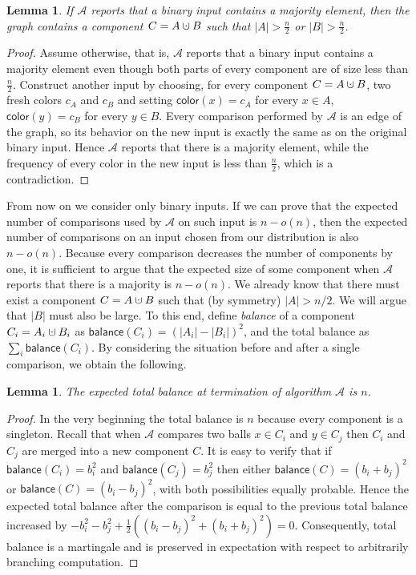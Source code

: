 \documentclass{article}[11pt,a4paper]
\newtheorem{lemma}[definition]{Lemma}
\newcommand{\ballcolor}{\mathsf{color}}
\newcommand{\balance}{\mathsf{balance}}
\newcommand{\cupdot}{\mathbin{\mathaccent\cdot\cup}}
\begin{document}
\begin{lemma}
\label{lem:terminate}
If $\mathcal{A}$ reports that a binary input contains a majority element, then the graph contains a
component $C = A \cupdot B$ such that $|A| > \frac{n}{2}$ or $|B| > \frac{n}{2}$.
\end{lemma}

\begin{proof}
Assume otherwise, that is, $\mathcal{A}$ reports that a binary input contains a majority element
even though both parts of every component are of size less than $\frac{n}{2}$. Construct another
input by choosing, for every component $C = A \cupdot B$, two fresh colors $c_A$ and $c_B$ and
setting $\ballcolor(x) = c_A$ for every $x\in A$, $\ballcolor(y) = c_B$ for every $y \in B$.
Every comparison performed by $\mathcal{A}$ is an edge of the graph, so its behavior on the new input
is exactly the same as on the original binary input. Hence $\mathcal{A}$ reports that there is
a majority element, while the frequency of every color in the new input is less than $\frac{n}{2}$,
which is a contradiction.
\end{proof}

From now on we consider only binary inputs. If we can prove that the expected number of comparisons
used by $\mathcal{A}$ on such input is $n-o(n)$, then the expected number of comparisons 
on an input chosen from our distribution is also $n-o(n)$.
Because every comparison decreases the number of components by one, it is sufficient to argue
that the expected size of some component when $\mathcal{A}$ reports that there is a majority
is $n-o(n)$. We already know that there must exist a component $C = A \cupdot B$ such that
(by symmetry) $|A| > n/2$. We will argue that $|B|$ must also be large.
To this end, define \emph{balance} of a component $C_i = A_i \cupdot B_i$ as
$\balance(C_i) = (|A_i|-|B_i|)^2$, and the total balance as $\sum_i \balance(C_i)$.
By considering the situation before and after a single comparison, we obtain the following.

\begin{lemma}
\label{lem:sum}
The expected total balance at termination of algorithm $\mathcal{A}$ is $n$.
\end{lemma}

\begin{proof}
In the very beginning the total balance is $n$ because every component is a singleton. Recall that
when $\mathcal{A}$ compares two balls $x\in C_i$ and $y\in C_j$ then $C_i$ and $C_j$ are
merged into a new component $C$. It is easy to verify that if $\balance(C_i)=b^2_i$ and
$\balance(C_j)=b^2_j$ then either $\balance(C) = (b_i + b_j)^2 $ or $\balance(C) = (b_i - b_j)^2$,
with both possibilities equally probable. Hence the expected total balance after the comparison
is equal to the previous total balance increased by
$ -b^2_i - b^2_j + \frac12((b_i - b_j)^2 + (b_i + b_j)^2) = 0$. 
Consequently, total balance is a martingale and is preserved in expectation with respect to arbitrarily branching computation.
\end{proof}
\end{document}
